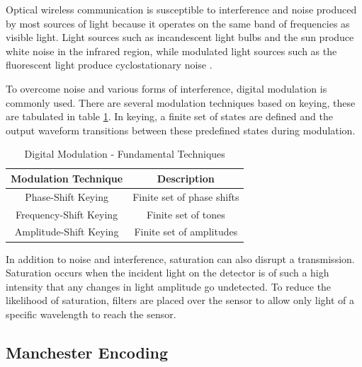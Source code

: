 
Optical wireless communication is susceptible to interference and noise produced by most sources of light because it operates on the same band of frequencies as visible light. Light sources such as incandescent light bulbs and the sun produce white noise in the infrared region, while modulated light sources such as the fluorescent light produce cyclostationary noise \cite{Carruther2000}.

To overcome noise and various forms of interference, digital modulation is commonly used. There are several modulation techniques based on keying, these are tabulated in table \ref{tbl:types_of_keying}. In keying, a finite set of states are defined and the output waveform transitions between these predefined states during modulation.

\begin{table}[H]
	\centering
	\begin{tabular}{cc}
		\hline
		\textbf{Modulation Technique} & \textbf{Description} \\ \hline
		Phase-Shift Keying & Finite set of phase shifts \\ \hline
		Frequency-Shift Keying & Finite set of tones \\ \hline
		Amplitude-Shift Keying & Finite set of amplitudes \\ \hline
	\end{tabular}
	\caption{Digital Modulation - Fundamental Techniques}
	\label{tbl:types_of_keying}
\end{table}


In addition to noise and interference, saturation can also disrupt a transmission. Saturation occurs when the incident light on the detector is of such a high intensity that any changes in light amplitude go undetected. To reduce the likelihood of saturation, filters are placed over the sensor to allow only light of a specific wavelength to reach the sensor.



\subsection{Manchester Encoding}
\label{sec:manchester_encoding}

